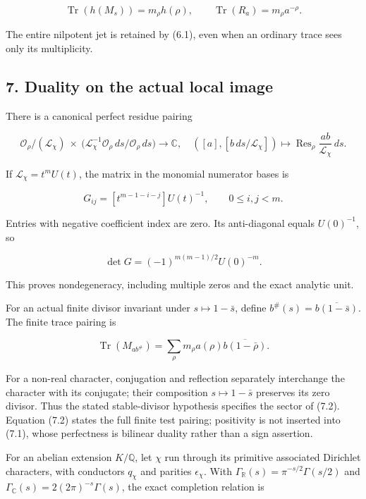 \documentclass[
]{article}
\begin{document}
\[
\operatorname{Tr}(h(M_s))=m_\rho h(\rho),
\qquad\operatorname{Tr}(R_a)=m_\rho a^{-\rho}.
\]

The entire nilpotent jet is retained by (6.1), even when an ordinary
trace sees only its multiplicity.

\subsection{7. Duality on the actual local
image}\label{duality-on-the-actual-local-image}

There is a canonical perfect residue pairing

\[
\mathcal O_\rho/(\mathscr L_\chi)\ \times\
\bigl(\mathscr L_\chi^{-1}\mathcal O_\rho\,ds/\mathcal O_\rho\,ds\bigr)
\longrightarrow\mathbb C,
\quad([a],[b\,ds/\mathscr L_\chi])\mapsto\operatorname{Res}_\rho\frac{ab}{\mathscr L_\chi}\,ds. \tag{7.1}
\]

If \(\mathscr L_\chi=t^mU(t)\), the matrix in the monomial numerator
bases is

\[
G_{ij}=[t^{m-1-i-j}]U(t)^{-1},\qquad0\le i,j<m.
\]

Entries with negative coefficient index are zero. Its anti-diagonal
equals \(U(0)^{-1}\), so

\[
\det G=(-1)^{m(m-1)/2}U(0)^{-m}.
\]

This proves nondegeneracy, including multiple zeros and the exact
analytic unit.

For an actual finite divisor invariant under \(s\mapsto1-\bar s\),
define \(b^\#(s)=\overline{b(1-\bar s)}\). The finite trace pairing is

\[
\operatorname{Tr}(M_{ab^\#})
=\sum_\rho m_\rho a(\rho)\overline{b(1-\bar\rho)}. \tag{7.2}
\]

For a non-real character, conjugation and reflection separately
interchange the character with its conjugate; their composition
\(s\mapsto1-\bar s\) preserves its zero divisor. Thus the stated
stable-divisor hypothesis specifies the sector of (7.2). Equation (7.2)
states the full finite test pairing; positivity is not inserted into
(7.1), whose perfectness is bilinear duality rather than a sign
assertion.

For an abelian extension \(K/\mathbb Q\), let \(\chi\) run through its
primitive associated Dirichlet characters, with conductors \(q_\chi\)
and parities \(\epsilon_\chi\). With
\(\Gamma_{\mathbb R}(s)=\pi^{-s/2}\Gamma(s/2)\) and
\(\Gamma_{\mathbb C}(s)=2(2\pi)^{-s}\Gamma(s)\), the exact completion
relation is
\end{document}
